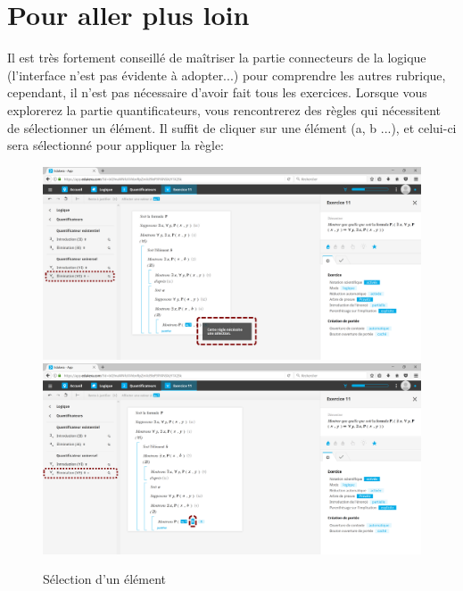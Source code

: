 \documentclass[a4paper]{article}
\begin{document}
\section{Pour aller plus loin}



Il est très fortement conseillé de maîtriser la partie connecteurs de la logique (l'interface n'est pas évidente à adopter...) pour comprendre les autres rubrique, cependant, il n'est pas nécessaire d'avoir fait tous les exercices.
Lorsque vous explorerez la partie quantificateurs, vous rencontrerez des règles qui nécessitent de sélectionner un élément.
Il suffit de cliquer sur une élément (a, b ...), et celui-ci sera sélectionné pour appliquer la règle:
\begin{figure}[h!]
\begin{center}
\includegraphics[scale=0.1]{img_app10.png}
\includegraphics[scale=0.1]{img_app11.png}
\end{center}
\caption{Sélection d'un élément}\label{im:selec_elem}
\end{figure}
\FloatBarrier



\end{document}
